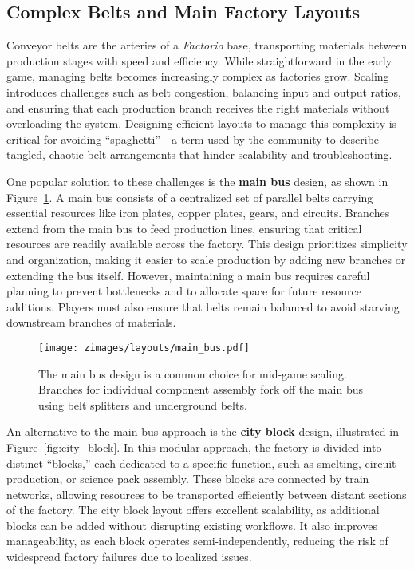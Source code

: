\subsection{Complex Belts and Main Factory Layouts}
% 
% 
Conveyor belts are the arteries of a \textit{Factorio} base, transporting materials between production stages with speed and efficiency. While straightforward in the early game, managing belts becomes increasingly complex as factories grow. Scaling introduces challenges such as belt congestion, balancing input and output ratios, and ensuring that each production branch receives the right materials without overloading the system. Designing efficient layouts to manage this complexity is critical for avoiding “spaghetti”—a term used by the community to describe tangled, chaotic belt arrangements that hinder scalability and troubleshooting.

One popular solution to these challenges is the \textbf{main bus} design, as shown in Figure~\ref{fig:main_bus}. A main bus consists of a centralized set of parallel belts carrying essential resources like iron plates, copper plates, gears, and circuits. Branches extend from the main bus to feed production lines, ensuring that critical resources are readily available across the factory. This design prioritizes simplicity and organization, making it easier to scale production by adding new branches or extending the bus itself. However, maintaining a main bus requires careful planning to prevent bottlenecks and to allocate space for future resource additions. Players must also ensure that belts remain balanced to avoid starving downstream branches of materials.

\begin{figure}[ht]
    \centering
    \texttt{[image: zimages/layouts/main\_bus.pdf]}
    \caption{The main bus design is a common choice for mid-game scaling. Branches for individual component assembly fork off the main bus using belt splitters and underground belts. \cite{mainBus}}
    \label{fig:main_bus}
\end{figure}

An alternative to the main bus approach is the \textbf{city block} design, illustrated in Figure~\ref{fig:city_block}. In this modular approach, the factory is divided into distinct “blocks,” each dedicated to a specific function, such as smelting, circuit production, or science pack assembly. These blocks are connected by train networks, allowing resources to be transported efficiently between distant sections of the factory. The city block layout offers excellent scalability, as additional blocks can be added without disrupting existing workflows. It also improves manageability, as each block operates semi-independently, reducing the risk of widespread factory failures due to localized issues.

